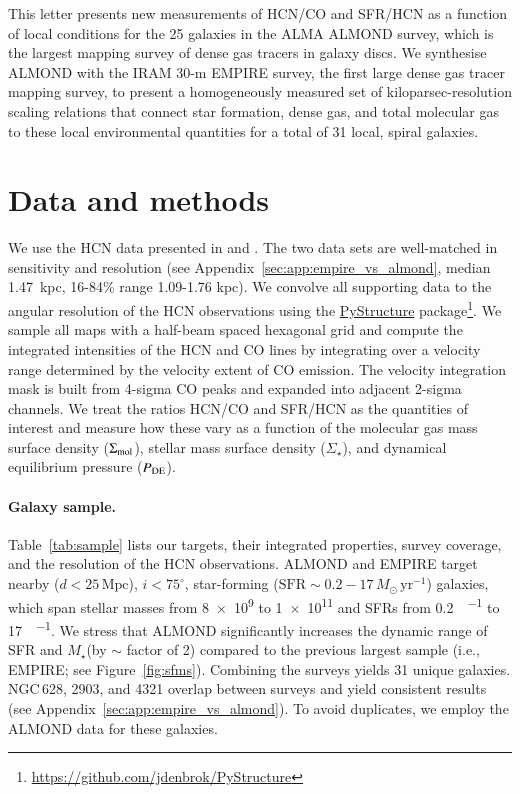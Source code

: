 \documentclass[letter, longauth]{aa} %
\newcommand*{\mstar}{\ensuremath{M_{\star}}\xspace}  %
\begin{document}
This letter presents new measurements of HCN/CO and SFR/HCN as a function of local conditions for the 25 galaxies in the ALMA ALMOND survey, which is the largest mapping survey of dense gas tracers in galaxy discs. 
We synthesise ALMOND with the IRAM 30-m EMPIRE survey, the first large dense gas tracer mapping survey, to present a homogeneously measured set of kiloparsec-resolution scaling relations that connect star formation, dense gas, and total molecular gas to these local environmental quantities for a total of 31 local, spiral galaxies. 

\section{Data and methods}
\label{sec:data}
We use the HCN data presented in \citet[][EMPIRE]{Jimenez-Donaire2019} and \citet[][ALMOND]{Neumann2023a}.
The two data sets are well-matched in sensitivity and resolution (see Appendix~\ref{sec:app:empire_vs_almond}, median 1.47~kpc, 16{-}84\% range 1.09{-}1.76 kpc). 
We convolve all supporting data to the angular resolution of the HCN observations using the \href{https://zenodo.org/records/13787728}{PyStructure} package\footnote{\url{https://github.com/jdenbrok/PyStructure}}. 
We sample all maps with a half-beam spaced hexagonal grid and compute the integrated intensities of the HCN and CO lines by integrating over a velocity range determined by the velocity extent of CO emission. 
The velocity integration mask is built from 4-sigma CO peaks and expanded into adjacent 2-sigma channels.
We treat the ratios HCN/CO and SFR/HCN as the quantities of interest and measure how these vary as a function of the molecular gas mass surface density ($\Sigma_{\rm mol}$), stellar mass surface density ($\Sigma_\star$), and dynamical equilibrium pressure ($P_{\rm DE}$).

\paragraph{Galaxy sample.} 

Table~\ref{tab:sample} lists our targets, their integrated properties, survey coverage, and the resolution of the HCN observations. 
ALMOND and EMPIRE target nearby ($d<25\,\mathrm{Mpc}$), $i<75^\circ$, star-forming ($\mathrm{SFR}\sim0.2-17\,M_\odot\,\mathrm{yr}^{-1}$) galaxies, which span stellar masses from \SI{8e9}{\msun} to \SI{1e11}{\msun} and SFRs from \SI{0.2}{\msun\per\year} to \SI{17}{\msun\per\year}.
We stress that ALMOND significantly increases the dynamic range of SFR and \mstar (by $\sim$ factor of 2) compared to the previous largest sample (i.e., EMPIRE; see Figure~\ref{fig:sfms}).
Combining the surveys yields 31 unique galaxies.
NGC\,628, 2903, and 4321 overlap between surveys and yield consistent results (see Appendix~\ref{sec:app:empire_vs_almond}). 
To avoid duplicates, we employ the ALMOND data for these galaxies.
\end{document}
